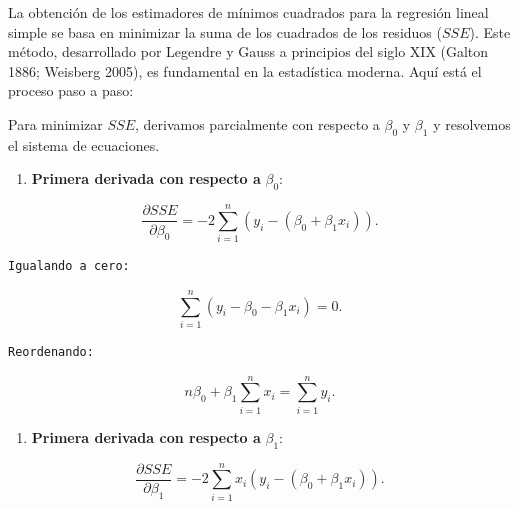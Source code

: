 \documentclass[
  letterpaper,
  DIV=11,
  numbers=noendperiod]{scrreprt}
\providecommand{\tightlist}{%
  \setlength{\itemsep}{0pt}\setlength{\parskip}{0pt}}
\begin{document}
\begin{tcolorbox}[enhanced jigsaw, breakable, toprule=.15mm, bottomtitle=1mm, coltitle=black, colbacktitle=quarto-callout-note-color!10!white, titlerule=0mm, opacitybacktitle=0.6, bottomrule=.15mm, toptitle=1mm, title=\textcolor{quarto-callout-note-color}{\faInfo}\hspace{0.5em}{Minimización de SSE}, arc=.35mm, rightrule=.15mm, opacityback=0, colframe=quarto-callout-note-color-frame, leftrule=.75mm, left=2mm, colback=white]

La obtención de los estimadores de mínimos cuadrados para la regresión
lineal simple se basa en minimizar la suma de los cuadrados de los
residuos (\(SSE\)). Este método, desarrollado por Legendre y Gauss a
principios del siglo XIX (Galton 1886; Weisberg 2005), es fundamental en
la estadística moderna. Aquí está el proceso paso a paso:

Para minimizar \(SSE\), derivamos parcialmente con respecto a
\(\beta_0\) y \(\beta_1\) y resolvemos el sistema de ecuaciones.

\begin{enumerate}
\def\labelenumi{\arabic{enumi}.}
\tightlist
\item
  \textbf{Primera derivada con respecto a} \(\beta_0\):
\end{enumerate}

\[
    \frac{\partial SSE}{\partial \beta_0} = -2\sum_{i=1}^n
    \left(y_i - (\beta_0 + \beta_1 x_i)\right).
  \]

\begin{verbatim}
Igualando a cero: 
\end{verbatim}

\[ 
    \sum_{i=1}^n \left(y_i - \beta_0 - \beta_1
    x_i\right) = 0. 
  \]

\begin{verbatim}
Reordenando: 
\end{verbatim}

\[
    n\beta_0 + \beta_1 \sum_{i=1}^n x_i = \sum_{i=1}^n y_i. \tag{1}
  \]

\begin{enumerate}
\def\labelenumi{\arabic{enumi}.}
\setcounter{enumi}{1}
\tightlist
\item
  \textbf{Primera derivada con respecto a} \(\beta_1\):
\end{enumerate}

\[
    \frac{\partial SSE}{\partial \beta_1} = -2\sum_{i=1}^n x_i
    \left(y_i - (\beta_0 + \beta_1 x_i)\right).
    \]


\end{tcolorbox}
\end{document}
